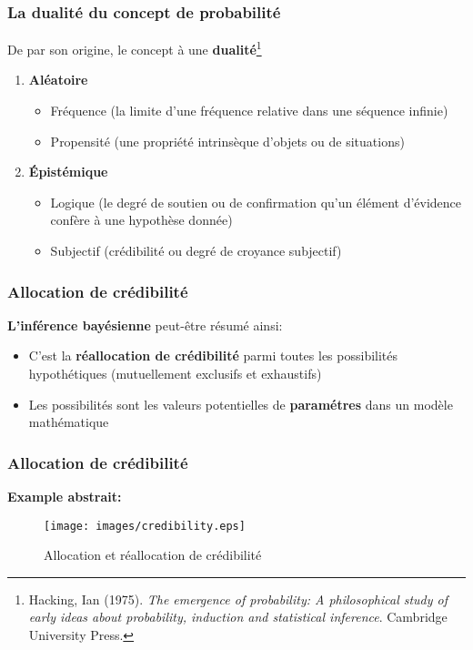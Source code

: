 \documentclass{beamer}
\begin{document}
\begin{frame}
    \frametitle{La dualité du concept de probabilité}

    De par son origine, le concept à une \textbf{dualité}\footnote{
    Hacking, Ian (1975). \emph{The emergence of probability:
    A philosophical study of early ideas about probability,
    induction and statistical inference}. Cambridge University Press.
    }

    \pause

    \vfill

    \begin{enumerate}
      \item \textbf{Aléatoire}
        \begin{itemize}
          \item Fréquence (la limite d'une fréquence relative dans une séquence infinie)
          \item Propensité (une propriété intrinsèque d'objets ou de situations)
        \end{itemize}

      \pause

      \item \textbf{Épistémique}
        \begin{itemize}
          \item Logique (le degré de soutien ou de confirmation qu'un élément d'évidence confère à une hypothèse donnée)
          \item Subjectif (crédibilité ou degré de croyance subjectif)
        \end{itemize}
    \end{enumerate}    
\end{frame}


\begin{frame}
    \frametitle{Allocation de crédibilité}
    \textbf{L'inférence bayésienne} peut-être résumé ainsi: \pause
    \begin{itemize}
      \item C'est la \textbf{réallocation de crédibilité} parmi toutes les possibilités hypothétiques
            (mutuellement exclusifs et exhaustifs)
      \pause
      \item Les possibilités sont les valeurs potentielles de \textbf{paramétres} dans un modèle mathématique
    \end{itemize}
\end{frame}


\begin{frame}
    \frametitle{Allocation de crédibilité}
    \textbf{Example abstrait:}
    
    \begin{figure}
      \centering
      \texttt{[image: images/credibility.eps]}
      \caption{Allocation et réallocation de crédibilité}
    \end{figure}
\end{frame}
\end{document}
